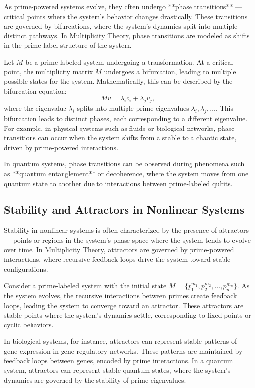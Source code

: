 \documentclass[%
 preprint, linenumbers,
 amsmath,amssymb,
 aps, physrev,
]{revtex4-2}
\begin{document}
As prime-powered systems evolve, they often undergo **phase transitions** — critical points where the system's behavior changes drastically. These transitions are governed by bifurcations, where the system's dynamics split into multiple distinct pathways. In Multiplicity Theory, phase transitions are modeled as shifts in the prime-label structure of the system.

Let \( M \) be a prime-labeled system undergoing a transformation. At a critical point, the multiplicity matrix \( M \) undergoes a bifurcation, leading to multiple possible states for the system. Mathematically, this can be described by the bifurcation equation:
\[
M v = \lambda_i v_i + \lambda_j v_j,
\]
where the eigenvalue \( \lambda_i \) splits into multiple prime eigenvalues \( \lambda_i, \lambda_j, \dots \). This bifurcation leads to distinct phases, each corresponding to a different eigenvalue. For example, in physical systems such as fluids or biological networks, phase transitions can occur when the system shifts from a stable to a chaotic state, driven by prime-powered interactions.

In quantum systems, phase transitions can be observed during phenomena such as **quantum entanglement** or decoherence, where the system moves from one quantum state to another due to interactions between prime-labeled qubits.

\subsection{Stability and Attractors in Nonlinear Systems}

Stability in nonlinear systems is often characterized by the presence of attractors — points or regions in the system’s phase space where the system tends to evolve over time. In Multiplicity Theory, attractors are governed by prime-powered interactions, where recursive feedback loops drive the system toward stable configurations.

Consider a prime-labeled system with the initial state \( M = \{p_1^{m_1}, p_2^{m_2}, \dots, p_n^{m_n}\} \). As the system evolves, the recursive interactions between primes create feedback loops, leading the system to converge toward an attractor. These attractors are stable points where the system's dynamics settle, corresponding to fixed points or cyclic behaviors. 

In biological systems, for instance, attractors can represent stable patterns of gene expression in gene regulatory networks. These patterns are maintained by feedback loops between genes, encoded by prime interactions. In a quantum system, attractors can represent stable quantum states, where the system’s dynamics are governed by the stability of prime eigenvalues.
\end{document}
